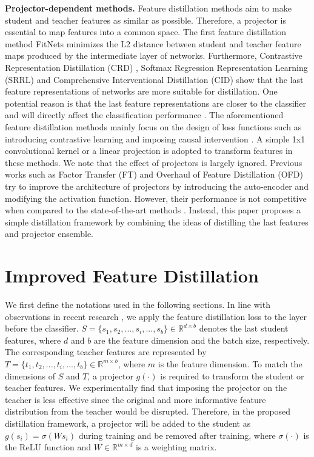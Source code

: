 \documentclass{article}
\begin{document}
\textbf{Projector-dependent methods.} Feature distillation methods aim to make student and teacher features as similar as possible. Therefore, a projector is essential to map features into a common space. The first feature distillation method FitNets \cite{fitnets} minimizes the L2 distance between student and teacher feature maps produced by the intermediate layer of networks. Furthermore, Contrastive Representation Distillation (CRD) \cite{crd}, Softmax Regression Representation Learning (SRRL) \cite{srrl} and Comprehensive Interventional Distillation (CID) \cite{cid} show that the last feature representations of networks are more suitable for distillation. One potential reason is that the last feature representations are closer to the classifier and will directly affect the classification performance \cite{srrl}. The aforementioned feature distillation methods mainly focus on the design of loss functions such as introducing contrastive learning \cite{crd} and imposing causal intervention \cite{cid}. A simple 1x1 convolutional kernel or a linear projection is adopted to transform features in these methods. We note that the effect of projectors is largely ignored. Previous works such as Factor Transfer (FT) \cite{ft} and Overhaul of Feature Distillation (OFD) \cite{ofd} try to improve the architecture of projectors by introducing the auto-encoder and modifying the activation function. However, their performance is not competitive when compared to the state-of-the-art methods \cite{srrl,cid}. Instead, this paper proposes a simple distillation framework by combining the ideas of distilling the last features and projector ensemble.

\section{Improved Feature Distillation} \label{methodsection}
We first define the notations used in the following sections. In line with observations in recent research \cite{crd,cid}, we apply the feature distillation loss to the layer before the classifier. $S=\{ s_{1},s_{2},...,s_{i},...,s_{b}\} \in \mathbb{R}^{d\times b}$ denotes the last student features, where $d$ and $b$ are the feature dimension and the batch size, respectively. The corresponding teacher features are represented by $T=\{ t_{1},t_{2},...,t_{i},...,t_{b}\} \in \mathbb{R}^{m\times b}$, where $m$ is the feature dimension. To match the dimensions of $S$ and $T$, a projector $g(\cdot)$ is required to transform the student or teacher features. We experimentally find that imposing the projector on the teacher is less effective since the original and more informative feature distribution from the teacher would be disrupted. %
Therefore, in the proposed distillation framework, a projector will be added to the student as $g(s_i)=\sigma(Ws_i)$ during training and be removed after training, where $\sigma(\cdot)$ is the ReLU function and $W \in \mathbb{R}^{m\times d}$ is a weighting matrix.
\end{document}
